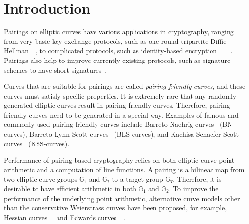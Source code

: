 %
%
%
%
%
%
%
%
%
%

\section{Introduction}

Pairings on elliptic curves have various applications in cryptography,
ranging from very basic key exchange protocols,
such as one round tripartite Diffie--Hellman~\cite{2000/joux-ants}~\cite{2004/joux-tripartite},
to complicated protocols, such as
identity-based encryption~\cite{2001/boneh}~\cite{2002/horwitz}~\cite{2002/gentry}~\cite{2005/sahai}.
Pairings also help to improve currently existing protocols, 
such as signature schemes to have short signatures~\cite{2004/boneh}.

Curves that are suitable for pairings are called {\emph{pairing-friendly curves}},
and these curves must satisfy specific properties.
It is extremely rare that any randomly generated elliptic curves result in pairing-friendly curves.
Therefore, pairing-friendly curves need to be generated in a special way.
Examples of famous and commonly used pairing-friendly curves include 
Barreto-Naehrig curves~\cite{2006/barreto} (BN-curves),
Barreto-Lynn-Scott curves~\cite{2003/bls} (BLS-curves), and
Kachisa-Schaefer-Scott curves~\cite{2008/kss} (KSS-curves).

Performance of pairing-based cryptography relies on both
elliptic-curve-point arithmetic and a computation of line functions.
A pairing is a bilinear map from two elliptic curve groups $\mathbb{G}_1$ and $\mathbb{G}_2$ to
a target group $\mathbb{G}_T$.
Therefore, it is desirable to have efficient arithmetic in both $\mathbb{G}_1$ and $\mathbb{G}_2$.
To improve the performance of the underlying point arithmetic,
alternative curve models other than the conservative Weierstrass curves have been proposed,
for example, Hessian curves~\cite{2001/smart}~\cite{2001/joye} and
Edwards curves~\cite{2007/edwards}~\cite{2007/bernstein-newelliptic}.

